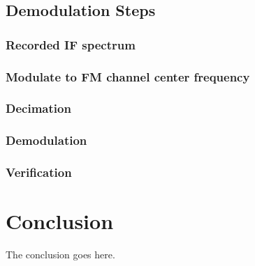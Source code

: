 \documentclass[conference]{IEEEtran}
\begin{document}
  \subsection{Demodulation Steps}
    \subsubsection{Recorded IF spectrum}
    \subsubsection{Modulate to FM channel center frequency}
    \subsubsection{Decimation}
    \subsubsection{Demodulation}
    \subsubsection{Verification}

\section{Conclusion}
  The conclusion goes here.


%
%

\end{document}
